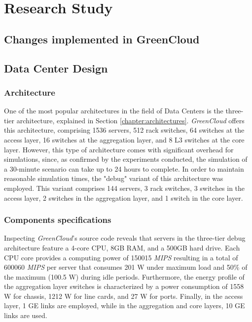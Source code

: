 \chapter{Research Study} \label{chapter:research_study}

\begin{citazione}

\end{citazione}
\newpage

\section{Changes implemented in GreenCloud}\label{section:greencloud_mod}

\section{Data Center Design}

\subsection{Architecture}
One of the most popular architectures in the field of Data Centers is the three-tier architecture, explained in Section \ref{chapter:architectures}. \emph{GreenCloud} offers this architecture, comprising 1536 servers, 512 rack switches, 64 switches at the access layer, 16 switches at the aggregation layer, and 8 L3 switches at the core layer. However, this type of architecture comes with significant overhead for simulations, since, as confirmed by the experiments conducted, the simulation of a 30-minute scenario can take up to 24 hours to complete. In order to maintain reasonable simulation times, the "debug" variant of this architecture was employed. This variant comprises 144 servers, 3 rack switches, 3 switches in the access layer, 2 switches in the aggregation layer, and 1 switch in the core layer. 

\subsection{Components specifications}
Inspecting \emph{GreenCloud}'s source code reveals that servers in the three-tier debug architecture feature a 4-core CPU, 8GB RAM, and a 500GB hard drive. Each CPU core provides a computing power of 150015 \emph{MIPS} resulting in a total of 600060 \emph{MIPS} per server that consumes 201 W under maximum load and 50\% of the maximum (100.5 W) during idle periods. Furthermore, the energy profile of the aggregation layer switches is characterized by a power consumption of 1558 W for chassis, 1212 W for line cards, and 27 W for ports. Finally, in the access layer, 1 GE links are employed, while in the aggregation and core layers, 10 GE links are used.

